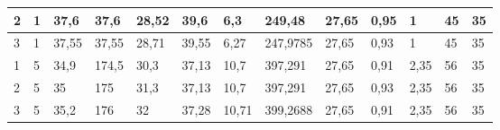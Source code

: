 \begin{table}[H]
{\begin{tabular}{|l|llll|lll|ll|l|ll|}
2             & \multicolumn{1}{l|}{\cellcolor[HTML]{E2EFDA}1}                & \multicolumn{1}{l|}{\cellcolor[HTML]{E2EFDA}37,6}             & \multicolumn{1}{l|}{\cellcolor[HTML]{E2EFDA}37,6}             & 28,52             & \multicolumn{1}{l|}{\cellcolor[HTML]{E2EFDA}39,6}              & \multicolumn{1}{l|}{\cellcolor[HTML]{E2EFDA}6,3}               & 249,48            & \multicolumn{1}{l|}{\cellcolor[HTML]{E2EFDA}27,65}            & 0,95             & 1                         & \multicolumn{1}{l|}{\cellcolor[HTML]{E2EFDA}45}                  & 35               \\ \hline
\rowcolor[HTML]{C6E0B4} 
3             & \multicolumn{1}{l|}{\cellcolor[HTML]{C6E0B4}1}                & \multicolumn{1}{l|}{\cellcolor[HTML]{C6E0B4}37,55}            & \multicolumn{1}{l|}{\cellcolor[HTML]{C6E0B4}37,55}            & 28,71             & \multicolumn{1}{l|}{\cellcolor[HTML]{C6E0B4}39,55}             & \multicolumn{1}{l|}{\cellcolor[HTML]{C6E0B4}6,27}              & 247,9785          & \multicolumn{1}{l|}{\cellcolor[HTML]{C6E0B4}27,65}            & 0,93             & 1                         & \multicolumn{1}{l|}{\cellcolor[HTML]{C6E0B4}45}                  & 35               \\ \hline
\rowcolor[HTML]{E2EFDA} 
1             & \multicolumn{1}{l|}{\cellcolor[HTML]{E2EFDA}5}                & \multicolumn{1}{l|}{\cellcolor[HTML]{E2EFDA}34,9}             & \multicolumn{1}{l|}{\cellcolor[HTML]{E2EFDA}174,5}            & 30,3              & \multicolumn{1}{l|}{\cellcolor[HTML]{E2EFDA}37,13}             & \multicolumn{1}{l|}{\cellcolor[HTML]{E2EFDA}10,7}              & 397,291           & \multicolumn{1}{l|}{\cellcolor[HTML]{E2EFDA}27,65}            & 0,91             & 2,35                      & \multicolumn{1}{l|}{\cellcolor[HTML]{E2EFDA}56}                  & 35               \\ \hline
\rowcolor[HTML]{C6E0B4} 
2             & \multicolumn{1}{l|}{\cellcolor[HTML]{C6E0B4}5}                & \multicolumn{1}{l|}{\cellcolor[HTML]{C6E0B4}35}               & \multicolumn{1}{l|}{\cellcolor[HTML]{C6E0B4}175}              & 31,3              & \multicolumn{1}{l|}{\cellcolor[HTML]{C6E0B4}37,13}             & \multicolumn{1}{l|}{\cellcolor[HTML]{C6E0B4}10,7}              & 397,291           & \multicolumn{1}{l|}{\cellcolor[HTML]{C6E0B4}27,65}            & 0,93             & 2,35                      & \multicolumn{1}{l|}{\cellcolor[HTML]{C6E0B4}56}                  & 35               \\ \hline
\rowcolor[HTML]{E2EFDA} 
3             & \multicolumn{1}{l|}{\cellcolor[HTML]{E2EFDA}5}                & \multicolumn{1}{l|}{\cellcolor[HTML]{E2EFDA}35,2}             & \multicolumn{1}{l|}{\cellcolor[HTML]{E2EFDA}176}              & 32                & \multicolumn{1}{l|}{\cellcolor[HTML]{E2EFDA}37,28}             & \multicolumn{1}{l|}{\cellcolor[HTML]{E2EFDA}10,71}             & 399,2688          & \multicolumn{1}{l|}{\cellcolor[HTML]{E2EFDA}27,65}            & 0,91             & 2,35                      & \multicolumn{1}{l|}{\cellcolor[HTML]{E2EFDA}56}                  & 35               \\ \hline

\end{tabular}}
\end{table}
